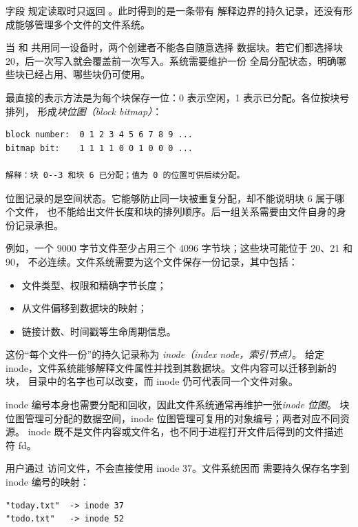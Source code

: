 字段  规定读取时只返回 。此时得到的是一条带有
解释边界的持久记录，还没有形成能够管理多个文件的文件系统。


当  和  共用同一设备时，两个创建者不能各自随意选择
数据块。若它们都选择块 20，后一次写入就会覆盖前一次写入。系统需要维护一份
全局分配状态，明确哪些块已经占用、哪些块仍可使用。

最直接的表示方法是为每个块保存一位：0 表示空闲，1 表示已分配。各位按块号排列，
形成\emph{块位图（block bitmap）}：

\begin{lstlisting}
block number:  0 1 2 3 4 5 6 7 8 9 ...
bitmap bit:    1 1 1 1 0 0 1 0 0 0 ...

解释：块 0--3 和块 6 已分配；值为 0 的位置可供后续分配。
\end{lstlisting}

位图记录的是空间状态。它能够防止同一块被重复分配，却不能说明块 6 属于哪个文件，
也不能给出文件长度和块的排列顺序。后一组关系需要由文件自身的身份记录承担。


例如，一个 9000 字节文件至少占用三个 4096 字节块；这些块可能位于 20、21 和 90，
不必连续。文件系统需要为这个文件保存一份记录，其中包括：

\begin{itemize}\tightlist
\item 文件类型、权限和精确字节长度；
\item 从文件偏移到数据块的映射；
\item 链接计数、时间戳等生命周期信息。
\end{itemize}

这份“每个文件一份”的持久记录称为 \emph{inode（index node，索引节点）}。
给定 inode，文件系统能够解释文件属性并找到其数据块。文件内容可以迁移到新的块，
目录中的名字也可以改变，而 inode 仍可代表同一个文件对象。

inode 编号本身也需要分配和回收，因此文件系统通常再维护一张\emph{inode 位图}。
块位图管理可分配的数据空间，inode 位图管理可复用的对象编号；两者对应不同资源。
inode 既不是文件内容或文件名，也不同于进程打开文件后得到的文件描述符 fd。


用户通过  访问文件，不会直接使用 inode 37。文件系统因而
需要持久保存名字到 inode 编号的映射：

\begin{lstlisting}
"today.txt"  -> inode 37
"todo.txt"   -> inode 52
\end{lstlisting}

